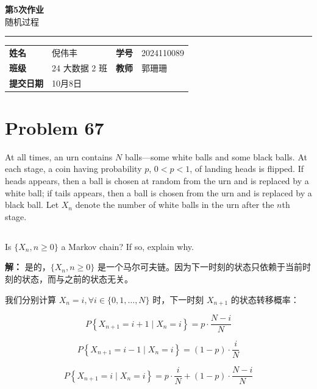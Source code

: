 \documentclass[12pt,a4paper]{article}
\newcommand{\course}{随机过程}
\newcommand{\homeworktitle}{第5次作业}
\newcommand{\studentname}{倪伟丰}
\newcommand{\studentid}{2024110089}
\newcommand{\classname}{24 大数据 2 班}
\newcommand{\teacher}{郭珊珊}
\newcommand{\duedate}{10月8日} %
\begin{document}
\begin{center}
  {\Huge\bfseries\color{mainblue}\homeworktitle}\\[0.6em]
  {\Large\course}\\[1.2em]
  {\color{linegray}\rule{0.9\textwidth}{0.8pt}}
\end{center}

\begin{infobox}
\begin{tabularx}{\linewidth}{>{\bfseries}p{2.2cm} X >{\bfseries}p{2.2cm} X}
姓名 & \studentname & 学号 & \studentid \\
班级 & \classname & 教师 & \teacher \\
提交日期 & \duedate &  &  \\
\end{tabularx}
\end{infobox}

\section{Problem 67}

At all times, an urn contains $N$ balls---some white balls and some black balls. At each stage, a coin having probability $p$, $0 < p < 1$, of landing heads is flipped. If heads appears, then a ball is chosen at random from the urn and is replaced by a white ball; if tails appears, then a ball is chosen from the urn and is replaced by a black ball. Let $X_n$ denote the number of white balls in the urn after the $n$th stage.

\subsection{}

Is $\{X_n, n \ge 0\}$ a Markov chain? If so, explain why.

\begin{answerbox}
\textbf{解：}
是的，$\{X_n, n \ge 0\}$ 是一个马尔可夫链。因为下一时刻的状态只依赖于当前时刻的状态，而与之前的状态无关。

我们分别计算 $X_n=i, \forall i \in \{0, 1, \ldots, N\}$ 时，下一时刻 $X_{n+1}$ 的状态转移概率：

$$
P\left\{X_{n+1}=i+1 \mid X_n=i\right\}=p\cdot \frac{N-i}{N}
$$

$$
P\left\{X_{n+1}=i-1 \mid X_n=i\right\}=(1-p)\cdot \frac{i}{N}
$$

$$
P\left\{X_{n+1}=i \mid X_n=i\right\}=p\cdot \frac{i}{N} + (1-p)\cdot \frac{N-i}{N}
$$
\end{answerbox}
\end{document}
